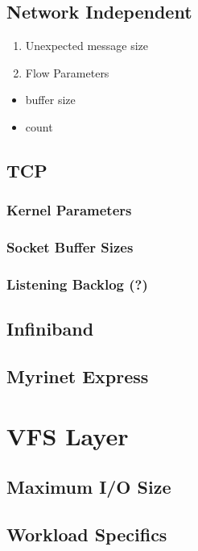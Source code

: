 \documentclass[11pt,letterpaper]{article}
\begin{document}
\subsection{Network Independent}

\begin{enumerate}
\item Unexpected message size
\item Flow Parameters
\end{enumerate}

\begin{itemize}
\item buffer size
\item count
\end{itemize}

\subsection{TCP}

\subsubsection{Kernel Parameters}
\subsubsection{Socket Buffer Sizes}
\subsubsection{Listening Backlog (?)}

\subsection{Infiniband}
\subsection{Myrinet Express}

\section{VFS Layer}

\subsection{Maximum I/O Size}

\subsection{Workload Specifics}
\end{document}
